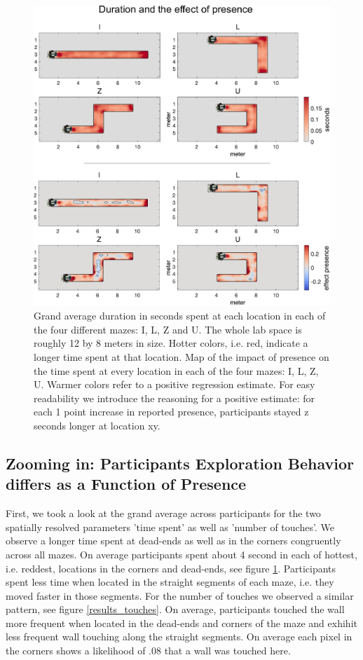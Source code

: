 \begin{figure}[h]
\centering
\includegraphics[width=.6\linewidth]{figures/duration.pdf}
\vspace{0pt}
\caption{Grand average duration in seconds spent at each location in each of the four different mazes: I, L, Z and U. The whole lab space is roughly 12 by 8 meters in size. Hotter colors, i.e. red, indicate a longer time spent at that location. Map of the impact of presence on the time spent at every location in each of the four mazes: I, L, Z, U. Warmer colors refer to a positive regression estimate. For easy readability we introduce the reasoning for a positive estimate: for each 1 point increase in reported presence, participants stayed z seconds longer at location xy.}
\label{results_duration}
\end{figure}

\subsection{Zooming in: Participants Exploration Behavior differs as a Function of Presence} First, we took a look at the grand average across participants for the two spatially resolved parameters 'time spent' as well as 'number of touches'. We observe a longer time spent at dead-ends as well as in the corners congruently across all mazes. On average participants spent about 4 second in each of hottest, i.e. reddest, locations in the corners and dead-ends, see figure \ref{results_duration}. Participants spent less time when located in the straight segments of each maze, i.e. they moved faster in those segments. For the number of touches we observed a similar pattern, see figure \ref{results_touches}. On average, participants touched the wall more frequent when located in the dead-ends and corners of the maze and exhihit less frequent wall touching along the straight segments. On average each pixel in the corners shows a likelihood of .08 that a wall was touched here.

